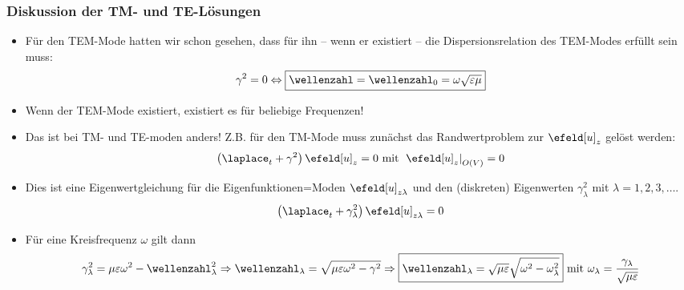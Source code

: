 \begin{frame}
  \frametitle{Diskussion der TM- und TE-Lösungen}
  \begin{itemize}[<+->]
  \item Für den \alert{TEM-Mode} hatten wir schon gesehen, dass für ihn -- wenn er existiert -- die \alert{Dispersionsrelation des TEM-Modes} erfüllt sein muss:
    \begin{equation*}
      \gamma^2=0 \Leftrightarrow \boxed{\wellenzahl=\wellenzahl_0=\omega\sqrt{\varepsilon\mu}}
    \end{equation*}
  \item Wenn der TEM-Mode existiert, existiert es für beliebige Frequenzen!
  \item Das ist bei TM- und TE-moden anders! Z.B. für den TM-Mode muss zunächst das Randwertproblem zur \(\efeld[u]_z\) gelöst werden:
    \begin{equation*}
      \left(\laplace_t + \gamma^2\right) \efeld[u]_z =  0 \text{ mit } \left. \efeld[u]_z\right|_{O(V)} = 0
    \end{equation*}
  \item Dies ist eine \alert{Eigenwertgleichung} für die \alert{Eigenfunktionen=Moden} \(\efeld[u]_{z\lambda}\) und den (diskreten) \alert{Eigenwerten} \(\gamma^2_\lambda\) mit \(\lambda = 1,2,3,\ldots\).
   \begin{equation*}
      \left(\laplace_t + \gamma_\lambda^2\right) \efeld[u]_{z\lambda} =  0
    \end{equation*}
  \item Für eine Kreisfrequenz \(\omega\) gilt dann
    \begin{equation*}
      \gamma_\lambda^2 = \mu\varepsilon\omega^2-\wellenzahl_\lambda^2 \Rightarrow \wellenzahl_\lambda=\sqrt{\mu\varepsilon\omega^2-\gamma^2} \Rightarrow  \boxed{\wellenzahl_\lambda=\sqrt{\mu\varepsilon}\sqrt{\omega^2-\omega_\lambda^2}} \text{ mit } \omega_\lambda=\frac{\gamma_\lambda}{\sqrt{\mu\varepsilon}} 
      \end{equation*}
 \end{itemize}
\end{frame}

